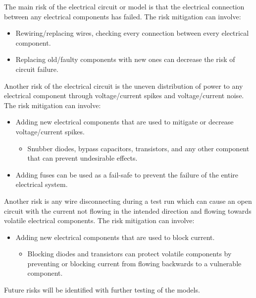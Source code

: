 \documentclass[a4paper, 10pt]{article}
\begin{document}
The main risk of the electrical circuit or model is that the electrical connection between any electrical components has failed. The risk mitigation can involve:

\begin{itemize}
\item
Rewiring/replacing wires, checking every connection between every electrical component.

\item
Replacing old/faulty components with new ones can decrease the risk of circuit failure.
\end{itemize}

Another risk of the electrical circuit is the uneven distribution of power to any electrical component through voltage/current spikes and voltage/current noise. The risk mitigation can involve:

\begin{itemize}
\item
Adding new electrical components that are used to mitigate or decrease voltage/current spikes.

	\begin{itemize}
		\item
		Snubber diodes, bypass capacitors, transistors, and any other component that can prevent undesirable effects. 
	\end{itemize}
	
\item
Adding fuses can be used as a fail-safe to prevent the failure of the entire electrical system.
\end{itemize}


Another risk is any wire disconnecting during a test run which can cause an open circuit with the current not flowing in the intended direction and flowing towards volatile electrical components. The risk mitigation can involve:

\begin{itemize}
\item
Adding new electrical components that are used to block current.

	\begin{itemize}
		\item
		Blocking diodes and transistors can protect volatile components by preventing or blocking current from flowing backwards to a vulnerable component. 
	\end{itemize}
\end{itemize}

Future risks will be identified with further testing of the models.
\end{document}
